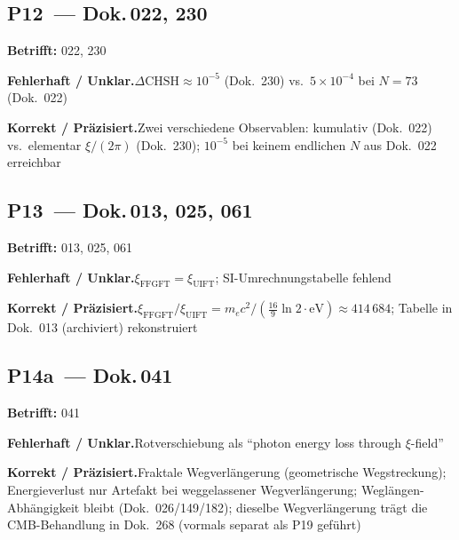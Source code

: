 \medskip


\subsection*{P12~--- Dok.\,022, 230}

\noindent\textbf{Betrifft:} 022, 230


\smallskip\noindent\textbf{Fehlerhaft / Unklar.}\quad $\Delta\text{CHSH} \approx 10^{-5}$ (Dok.~230) vs.\
  $5\times10^{-4}$ bei $N=73$ (Dok.~022)


\smallskip\noindent\textbf{Korrekt / Präzisiert.}\quad Zwei verschiedene Observablen: kumulativ (Dok.~022) vs.\ elementar $\xi/(2\pi)$ (Dok.~230);
  $10^{-5}$ bei keinem endlichen $N$ aus Dok.~022 erreichbar


\medskip


\subsection*{P13~--- Dok.\,013, 025, 061}

\noindent\textbf{Betrifft:} 013, 025, 061


\smallskip\noindent\textbf{Fehlerhaft / Unklar.}\quad $\xi_\text{FFGFT} = \xi_\text{UIFT}$; \newline
  SI-Umrechnungstabelle fehlend


\smallskip\noindent\textbf{Korrekt / Präzisiert.}\quad $\xi_\text{FFGFT}/\xi_\text{UIFT} = m_ec^2/(\frac{16}{9}\ln 2\cdot\text{eV}) \approx 414\,684$; \newline
  Tabelle in Dok.~013 (archiviert) rekonstruiert


\medskip


\subsection*{P14a~--- Dok.\,041}

\noindent\textbf{Betrifft:} 041


\smallskip\noindent\textbf{Fehlerhaft / Unklar.}\quad Rotverschiebung als \enquote{photon energy loss through $\xi$-field}


\smallskip\noindent\textbf{Korrekt / Präzisiert.}\quad Fraktale Wegverlängerung (geometrische Wegstreckung); Energieverlust nur Artefakt bei weggelassener Wegverlängerung; Weglängen-Abhängigkeit bleibt (Dok.~026/149/182); dieselbe Wegverlängerung trägt die CMB-Behandlung in Dok.~268 (vormals separat als P19 geführt)


